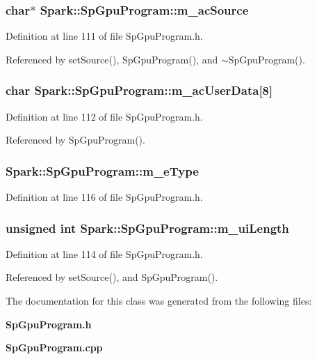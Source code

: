 \subsubsection{\setlength{\rightskip}{0pt plus 5cm}char$\ast$ {\bf Spark::Sp\-Gpu\-Program::m\_\-ac\-Source}\hspace{0.3cm}{\tt  [protected]}}\label{classSpark_1_1SpGpuProgram_p0}


Definition at line 111 of file Sp\-Gpu\-Program.h.

Referenced by set\-Source(), Sp\-Gpu\-Program(), and $\sim$Sp\-Gpu\-Program().
\subsubsection{\setlength{\rightskip}{0pt plus 5cm}char {\bf Spark::Sp\-Gpu\-Program::m\_\-ac\-User\-Data}[8]\hspace{0.3cm}{\tt  [protected]}}\label{classSpark_1_1SpGpuProgram_p1}


Definition at line 112 of file Sp\-Gpu\-Program.h.

Referenced by Sp\-Gpu\-Program().
\subsubsection{ {\bf Spark::Sp\-Gpu\-Program::m\_\-e\-Type}\hspace{0.3cm}{\tt  [protected]}}\label{classSpark_1_1SpGpuProgram_p3}


Definition at line 116 of file Sp\-Gpu\-Program.h.
\subsubsection{\setlength{\rightskip}{0pt plus 5cm}unsigned int {\bf Spark::Sp\-Gpu\-Program::m\_\-ui\-Length}\hspace{0.3cm}{\tt  [protected]}}\label{classSpark_1_1SpGpuProgram_p2}


Definition at line 114 of file Sp\-Gpu\-Program.h.

Referenced by set\-Source(), and Sp\-Gpu\-Program().

The documentation for this class was generated from the following files:\begin{CompactItemize}
\item 
{\bf Sp\-Gpu\-Program.h}\item 
{\bf Sp\-Gpu\-Program.cpp}\end{CompactItemize}
